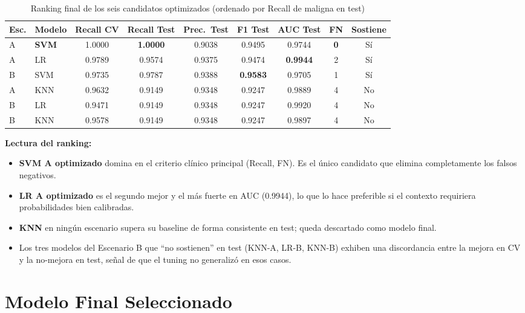 \documentclass[11pt,a4paper]{article}
\begin{document}
\begin{table}[H]
\centering
\caption{Ranking final de los seis candidatos optimizados (ordenado por Recall de maligna en test)}
\small
\renewcommand{\arraystretch}{1.2}
\begin{tabular}{llccccccc}
\toprule
\textbf{Esc.} & \textbf{Modelo} & \textbf{Recall CV} & \textbf{Recall Test} & \textbf{Prec.\ Test} & \textbf{F1 Test} & \textbf{AUC Test} & \textbf{FN} & \textbf{Sostiene} \\
\midrule
\rowcolor{bestrow}
A & \textbf{SVM} & 1.0000 & \textbf{1.0000} & 0.9038 & 0.9495 & 0.9744 & \textbf{0} & Sí \\
A & LR & 0.9789 & 0.9574 & 0.9375 & 0.9474 & \textbf{0.9944} & 2 & Sí \\
\rowcolor{neutralrow}
B & SVM & 0.9735 & 0.9787 & 0.9388 & \textbf{0.9583} & 0.9705 & 1 & Sí \\
A & KNN & 0.9632 & 0.9149 & 0.9348 & 0.9247 & 0.9889 & 4 & No \\
\rowcolor{warnrow}
B & LR & 0.9471 & 0.9149 & 0.9348 & 0.9247 & 0.9920 & 4 & No \\
\rowcolor{warnrow}
B & KNN & 0.9578 & 0.9149 & 0.9348 & 0.9247 & 0.9897 & 4 & No \\
\bottomrule
\end{tabular}
\normalsize
\end{table}

\textbf{Lectura del ranking:}
\begin{itemize}[leftmargin=1.4cm]
\item \textbf{SVM A optimizado} domina en el criterio clínico principal (Recall, FN). Es el único candidato que elimina completamente los falsos negativos.
\item \textbf{LR A optimizado} es el segundo mejor y el más fuerte en AUC (0.9944), lo que lo hace preferible si el contexto requiriera probabilidades bien calibradas.
\item \textbf{KNN} en ningún escenario supera su baseline de forma consistente en test; queda descartado como modelo final.
\item Los tres modelos del Escenario B que ``no sostienen'' en test (KNN-A, LR-B, KNN-B) exhiben una discordancia entre la mejora en CV y la no-mejora en test, señal de que el tuning no generalizó en esos casos.
\end{itemize}

\section{Modelo Final Seleccionado}
\end{document}
